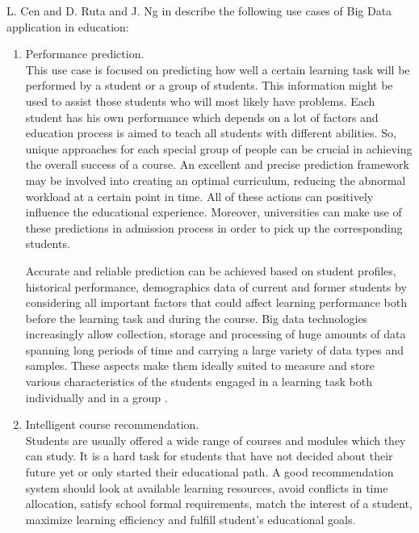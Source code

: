 \documentclass[runningheads]{llncs}
\begin{document}
L. Cen and D. Ruta and J. Ng in \cite{EDUCATIONOPPORTUNITIES} describe the following use cases of Big Data application in education:

\begin{enumerate}
\item Performance prediction.\\

This use case is focused on predicting how well a certain learning task will be performed by a student or a group of students. This information might be used to assist those students who will most likely have problems. Each student has his own performance which depends on a lot of factors and education process is aimed to teach all students with different abilities. So, unique approaches for each special group of people can be crucial in achieving the overall success of a course. An excellent and precise prediction framework may be involved into creating an optimal curriculum, reducing the abnormal workload at a certain point in time. All of these actions can positively influence the educational experience. Moreover, universities can make use of these predictions in admission process in order to pick up the corresponding students.

Accurate and reliable prediction can be achieved based on student profiles, historical performance, demographics data of current and former students by considering all important factors that could affect learning performance both before the learning task and during the course. Big data technologies increasingly allow collection, storage and processing of huge amounts of data spanning long periods of time and carrying a large variety of data types and samples. These aspects make them ideally suited to measure and store various characteristics of the students engaged in a learning task both individually and in a group \cite{EDUCATIONOPPORTUNITIES}.\\

\item Intelligent course recommendation.\\

Students are usually offered a wide range of courses and modules which they can study. It is a hard task for students that have not decided about their future yet or only started their educational path. A good recommendation system should look at available learning resources, avoid conflicts in time allocation, satisfy school formal requirements, match the interest of a student, maximize learning efficiency and fulfill student's educational goals.


\end{enumerate}
\end{document}
